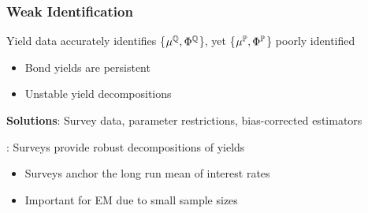 \documentclass[12pt, aspectratio=169, xcolor=dvipsnames]{beamer}
\begin{document}
\begin{frame}
\frametitle{Weak Identification}

Yield data accurately identifies \{\(\mu^{\mathbb{Q}}, \Phi^{\mathbb{Q}}\)\}, yet \{\(\mu^{\mathbb{P}}, \Phi^{\mathbb{P}}\)\} \alert{poorly} identified
\begin{itemize}
	\item Bond yields are persistent
	\item Unstable yield decompositions
\end{itemize}

\textbf{\alert{Solutions}}: Survey data, parameter restrictions, bias-corrected estimators

\cite{Guimaraes:2014}: Surveys provide \alert{robust} decompositions of yields
\begin{itemize}
	\item Surveys anchor the long run mean of interest rates
	\item Important for EM due to small sample sizes
\end{itemize}

\end{frame}
\end{document}
